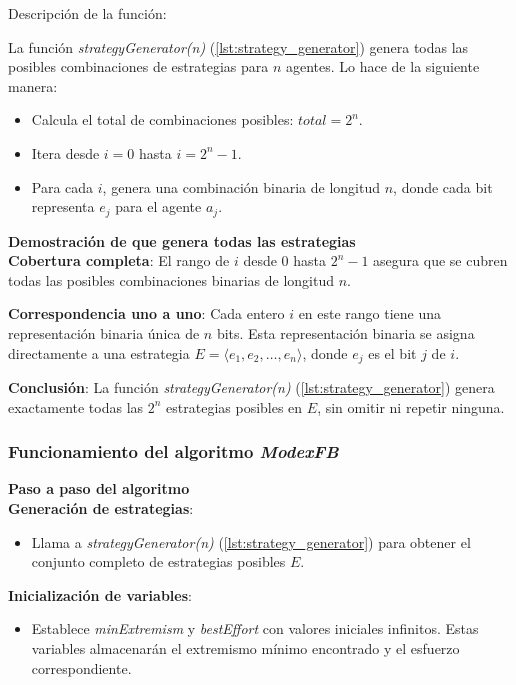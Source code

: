 \documentclass[letterpaper,10pt]{article}
\begin{document}
Descripción de la función:

La función \textit{strategyGenerator(n)} (\ref{lst:strategy_generator}) genera todas las posibles combinaciones de estrategias para $n$ agentes. Lo hace de la siguiente manera:

\begin{itemize}
    \item Calcula el total de combinaciones posibles: $total = 2^n$.
    \item Itera desde $i = 0$ hasta $i = 2^n - 1$.
    \item Para cada $i$, genera una combinación binaria de longitud $n$, donde cada bit representa $e_j$ para el agente $a_j$.
\end{itemize}

\textbf{Demostración de que genera todas las estrategias}
\\

\textbf{Cobertura completa}: El rango de $i$ desde $0$ hasta $2^n - 1$ asegura que se cubren todas las posibles combinaciones binarias de longitud $n$.

\textbf{Correspondencia uno a uno}: Cada entero $i$ en este rango tiene una representación binaria única de $n$ bits. Esta representación binaria se asigna directamente a una estrategia $E = \langle e_1, e_2, \dots, e_n \rangle$, donde $e_j$ es el bit $j$ de $i$.

\textbf{Conclusión}: La función \textit{strategyGenerator(n)} (\ref{lst:strategy_generator}) genera exactamente todas las $2^n$ estrategias posibles en $E$, sin omitir ni repetir ninguna.

\subsubsection*{Funcionamiento del algoritmo \textit{ModexFB}}

\textbf{Paso a paso del algoritmo}
\\

\textbf{Generación de estrategias}:
\begin{itemize}
    \item Llama a \textit{strategyGenerator(n)} (\ref{lst:strategy_generator}) para obtener el conjunto completo de estrategias posibles $E$.
\end{itemize}

\textbf{Inicialización de variables}:
\begin{itemize}
    \item Establece \textit{minExtremism} y \textit{bestEffort} con valores iniciales infinitos. Estas variables almacenarán el extremismo mínimo encontrado y el esfuerzo correspondiente.
\end{itemize}
\end{document}
